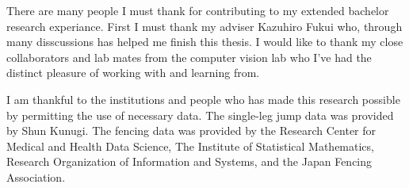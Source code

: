 There are many people I must thank for contributing to my extended bachelor research experiance. First I must thank my adviser Kazuhiro Fukui who, through many disscussions has helped me finish this thesis. 
I would like to thank my close collaborators and lab mates from the computer vision lab who I’ve had the distinct pleasure of working with and learning from. 

I am thankful to the institutions and people who has made this research possible by permitting the use of necessary data. The single-leg jump data was provided by Shun Kunugi. The fencing data was provided by the Research Center for Medical and Health Data Science, The Institute of Statistical Mathematics, Research Organization of Information and Systems, and the Japan Fencing Association. 